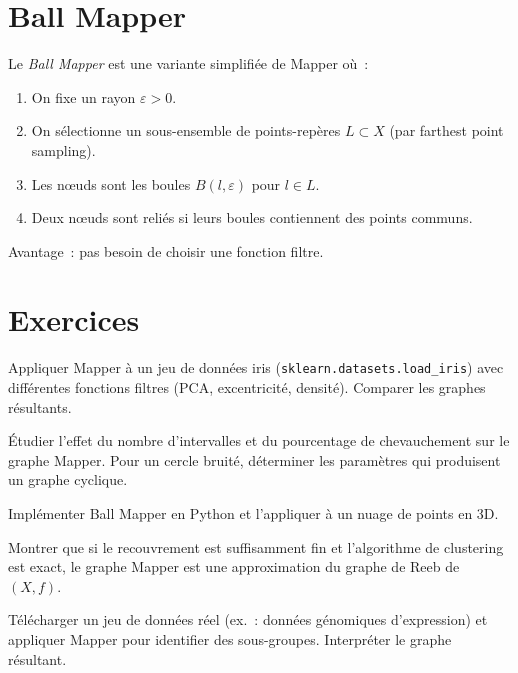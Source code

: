 \section{Ball Mapper}

\begin{definition}
Le \emph{Ball Mapper} est une variante simplifi\'ee de Mapper o\`u~:
\begin{enumerate}
  \item On fixe un rayon $\varepsilon > 0$.
  \item On s\'electionne un sous-ensemble de points-rep\`eres
        $L \subset X$ (par farthest point sampling).
  \item Les n\oe{}uds sont les boules $B(l, \varepsilon)$ pour
        $l \in L$.
  \item Deux n\oe{}uds sont reli\'es si leurs boules contiennent des
        points communs.
\end{enumerate}
Avantage~: pas besoin de choisir une fonction filtre.
\end{definition}

\section{Exercices}

\begin{exercice}
Appliquer Mapper \`a un jeu de donn\'ees iris (\texttt{sklearn.datasets.load\_iris})
avec diff\'erentes fonctions filtres (PCA, excentricit\'e, densit\'e).
Comparer les graphes r\'esultants.
\end{exercice}

\begin{exercice}
\'Etudier l'effet du nombre d'intervalles et du pourcentage de
chevauchement sur le graphe Mapper. Pour un cercle bruit\'e, d\'eterminer
les param\`etres qui produisent un graphe cyclique.
\end{exercice}

\begin{exercice}
Impl\'ementer Ball Mapper en Python et l'appliquer \`a un nuage de
points en 3D.
\end{exercice}

\begin{exercice}
Montrer que si le recouvrement est suffisamment fin et l'algorithme de
clustering est exact, le graphe Mapper est une approximation du graphe
de Reeb de $(X, f)$.
\end{exercice}

\begin{exercice}
T\'el\'echarger un jeu de donn\'ees r\'eel (ex.~: donn\'ees g\'enomiques
d'expression) et appliquer Mapper pour identifier des sous-groupes.
Interpr\'eter le graphe r\'esultant.
\end{exercice}

